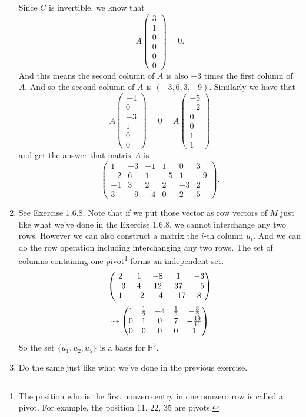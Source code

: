 \begin{enumerate}
Since $C$ is invertible, we know that 
\[A\begin{pmatrix}3\\1\\0\\0\\0\\0\end{pmatrix}=0.\]
And this means the second column of $A$ is also $-3$ times the first column of $A$. And so the second column of $A$ is $(-3,6,3,-9)$. Similarly we have that 
\[A\begin{pmatrix}-4\\0\\-3\\1\\0\\0\end{pmatrix}=0=A\begin{pmatrix}-5\\-2\\0\\0\\1\\1\end{pmatrix}\]
and get the answer that matrix $A$ is 
\[\begin{pmatrix}1&-3&-1&1&0&3\\-2&6&1&-5&1&-9\\-1&3&2&2&-3&2\\3&-9&-4&0&2&5\end{pmatrix}.\]
\item See Exercise 1.6.8. Note that if we put those vector as row vectors of $M$ just like what we've done in the Exercise 1.6.8, we cannot interchange any two rows. However we can also construct a matrix the $i$-th column $u_i$. And we can do the row operation including interchanging any two rows. The set of columns containing one pivot\footnote{The position who is the first nonzero entry in one nonzero row is called a pivot. For example, the position $11$, $22$, $35$ are pivots.} forms an independent set.
\[\begin{pmatrix}2 & 1 & -8 & 1 & -3\cr -3 & 4 & 12 & 37 & -5\cr 1 & -2 & -4 & -17 & 8\end{pmatrix}\]
\[\rightsquigarrow \begin{pmatrix}1 & \frac{1}{2} & -4 & \frac{1}{2} & -\frac{3}{2}\cr 0 & 1 & 0 & 7 & -\frac{19}{11}\cr 0 & 0 & 0 & 0 & 1\end{pmatrix}\]
So the set $\{u_1,u_2,u_5\}$ is a basis for $\mathbb{R}^3$.
\item Do the same just like what we've done in the previous exercise. 

\end{enumerate}
